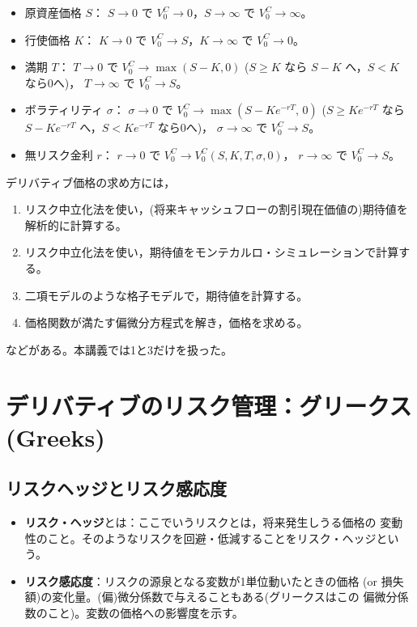 \begin{itemize}
\item 原資産価格 $S$：
$S \to 0$ で $V_0^C \to 0$，\quad $S\to\infty$ で $V_0^C \to\infty$。
\item 行使価格 $K$：
$K \to 0$ で $V_0^C \to S$，\quad $K\to\infty$ で $V_0^C \to 0$。
\item 満期 $T$：
$T\to 0$ で $V_0^C \to \max(S-K, 0)$
($S\geq K$ なら $S-K$ へ，$S<K$ なら0へ)，\quad
$T\to\infty$ で $V_0^C \to S$。
\item ボラティリティ $\sigma$：
$\sigma\to 0$ で $V_0^C \to \max(S - Ke^{-rT},\,0)$
($S\geq Ke^{-rT}$ なら $S - Ke^{-rT}$ へ，$S<Ke^{-rT}$ なら0へ)，\quad
$\sigma\to\infty$ で $V_0^C \to S$。
\item 無リスク金利 $r$：
$r\to 0$ で $V_0^C \to V_0^C(S,K,T,\sigma,0)$，\quad
$r\to\infty$ で $V_0^C \to S$。
\end{itemize}

\begin{remark}[参考：デリバティブ価格の求め方]
デリバティブ価格の求め方には，
\begin{enumerate}
\item リスク中立化法を使い，(将来キャッシュフローの割引現在価値の)期待値を
解析的に計算する。
\item リスク中立化法を使い，期待値をモンテカルロ・シミュレーションで計算する。
\item 二項モデルのような格子モデルで，期待値を計算する。
\item 価格関数が満たす偏微分方程式を解き，価格を求める。
\end{enumerate}
などがある。本講義では1と3だけを扱った。
\end{remark}

\vspace{18pt}

\section{デリバティブのリスク管理：グリークス (Greeks)}

\subsection{リスクヘッジとリスク感応度}

\begin{itemize}
\item \textbf{リスク・ヘッジ}とは：ここでいうリスクとは，将来発生しうる価格の
変動性のこと。そのようなリスクを回避・低減することをリスク・ヘッジという。
\item \textbf{リスク感応度}：リスクの源泉となる変数が1単位動いたときの価格
(or 損失額)の変化量。(偏)微分係数で与えることもある(グリークスはこの
偏微分係数のこと)。変数の価格への影響度を示す。
\end{itemize}

